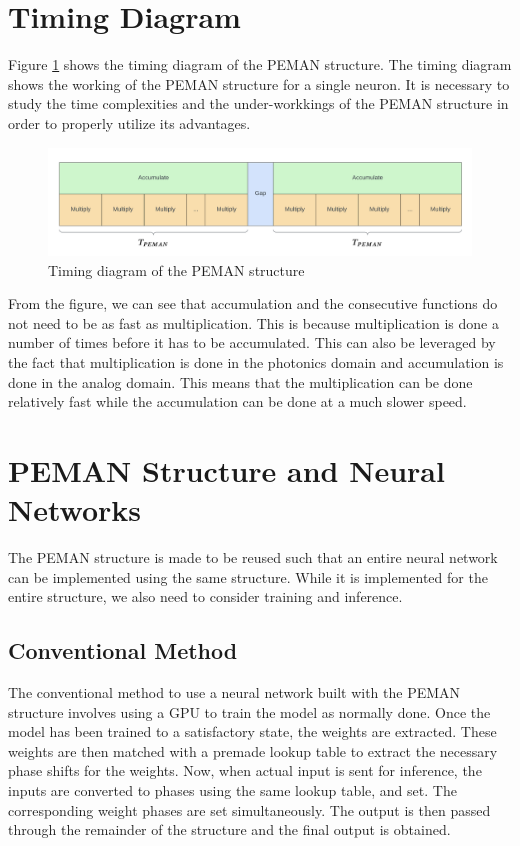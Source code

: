 \section{Timing Diagram}

Figure \ref{timing} shows the timing diagram of the PEMAN structure. The timing diagram shows the working of the PEMAN structure for a single neuron. It is necessary to study the time complexities and the under-workkings of the PEMAN structure in order to properly utilize its advantages.

\begin{figure}
	\centering
	\includegraphics[width=\textwidth]{images/timing.png}
	\caption{Timing diagram of the PEMAN structure}
	\label{timing}
\end{figure}

From the figure, we can see that accumulation and the consecutive functions do not need to be as fast as multiplication. This is because multiplication is done a number of times before it has to be accumulated. This can also be leveraged by the fact that multiplication is done in the photonics domain and accumulation is done in the analog domain. This means that the multiplication can be done relatively fast while the accumulation can be done at a much slower speed.

\section{PEMAN Structure and Neural Networks}

The PEMAN structure is made to be reused such that an entire neural network can be implemented using the same structure. While it is implemented for the entire structure, we also need to consider training and inference.

\subsection{Conventional Method}

The conventional method to use a neural network built with the PEMAN structure involves using a GPU to train the model as normally done. Once the model has been trained to a satisfactory state, the weights are extracted. These weights are then matched with a premade lookup table to extract the necessary phase shifts for the weights. Now, when actual input is sent for inference, the inputs are converted to phases using the same lookup table, and set. The corresponding weight phases are set simultaneously. The output is then passed through the remainder of the structure and the final output is obtained.

